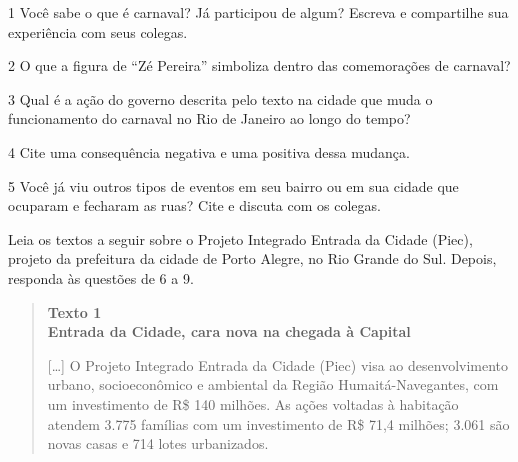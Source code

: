 \num{1} Você sabe o que é carnaval? Já participou de algum? Escreva e
compartilhe sua experiência com seus colegas.


\pagebreak

\num{2} O que a figura de “Zé Pereira” simboliza dentro das comemorações de
carnaval?


\num{3} Qual é a ação do governo descrita pelo texto na cidade que muda o
funcionamento do carnaval no Rio de Janeiro ao longo do tempo?


\num{4} Cite uma consequência negativa e uma positiva dessa mudança.


\num{5} Você já viu outros tipos de eventos em seu bairro ou em sua cidade que
ocuparam e fecharam as ruas? Cite e discuta com os colegas.


\bigskip
\noindent{}Leia os textos a seguir sobre o Projeto Integrado Entrada da Cidade
(Piec), projeto da prefeitura da cidade de Porto Alegre, no Rio Grande
do Sul. Depois, responda às questões de 6 a 9.

\pagebreak
\begin{quote}
\textbf{Texto 1}\\
\textbf{Entrada da Cidade, cara nova na chegada à Capital}

{[}\ldots{}{]} O Projeto Integrado Entrada da Cidade (Piec) visa ao desenvolvimento
urbano, socioeconômico e ambiental da Região Humaitá-Navegantes, com um
investimento de R\$ 140 milhões. As ações voltadas à habitação atendem
3.775 famílias com um investimento de R\$ 71,4 milhões; 3.061 são novas
casas e 714 lotes urbanizados.

\end{quote}

